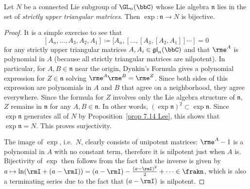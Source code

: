 \begin{cor}\label{cor 5.16 Sepanski}
    Let $N$ be a connected Lie subgroup of $\GL_n(\bbC)$ whose Lie algebra $\mathfrak{n}$ lies in the set of \emph{strictly upper triangular matrices}. Then $\exp:\mathfrak{n}\to N$ is bijective. 
\end{cor}
\begin{proof}
    It is a simple exercise to see that 
    \[[A_n,\ldots,A_3,A_2,A_1]\coloneqq [A_n,[\ldots,[A_3,[A_2,A_1]]\cdots ]=0\] 
    for any strictly upper triangular matrices $A,A_i\in \mathfrak{gl}_n(\bbC)$ and that $\rme^A$ is polynomial in $A$ (because all strictly triangular matrices are nilpotent). In particular, for $A,B\in\mathfrak{n}$ near the origin, Dynkin's Formula gives a polynomial expression for $Z\in\mathfrak{n}$ solving $\rme^A\rme^B=\rme^Z$. Since both sides of this expression are polynomials in $A$ and $B$ that agree on a neighborhood, they agree everywhere. Since the formula for $Z$ involves only the Lie algebra structure of $\mathfrak{n}$, $Z$ remains in $\mathfrak{n}$ for any $A,B\in\mathfrak{n}$. In other words, $(\exp\mathfrak{n})^2\subset \exp\mathfrak{n}$. Since $\exp\mathfrak{n}$ generates all of $N$ by Proposition~\ref{prop 7.14 Lee}, this shows that $\exp\mathfrak{n}=N$. This proves surjectivity.

    The image of $\exp$, i.e.~$N$, clearly consists of unipotent matrices: $\rme^A-1$ is a polynomial in $A$ with no constant term, therefore it is nilpotent just when $A$ is. Bijectivity of $\exp$ then follows from the fact that the inverse is given by $a\mapsto \ln (\rmI+(a-\rmI))=(a-\rmI)-\frac{(a-\rmI)^2}{2}+\cdots\in\frakn$, which is also a terminating series due to the fact that $(a-\rmI)$ is nilpotent.
\end{proof}

